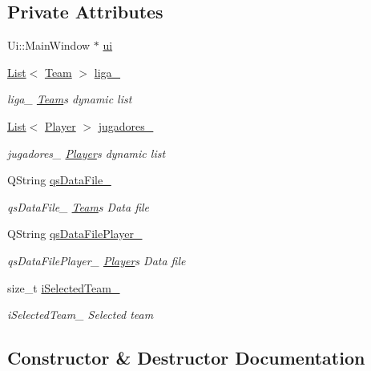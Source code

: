 \subsection*{Private Attributes}
\begin{DoxyCompactItemize}
\item 
Ui\+::\+Main\+Window $\ast$ \hyperlink{class_main_window_a35466a70ed47252a0191168126a352a5}{ui}
\item 
\hyperlink{class_list}{List}$<$ \hyperlink{class_team}{Team} $>$ \hyperlink{class_main_window_a5358b34e5fbb97d75dc06c61e7ae50fb}{liga\+\_\+}
\begin{DoxyCompactList}\small\item\em liga\+\_\+ \hyperlink{class_team}{Team}\textquotesingle{}s dynamic list \end{DoxyCompactList}\item 
\hyperlink{class_list}{List}$<$ \hyperlink{class_player}{Player} $>$ \hyperlink{class_main_window_aa0bb31955571995d85c4d9fda8bc9bbb}{jugadores\+\_\+}
\begin{DoxyCompactList}\small\item\em jugadores\+\_\+ \hyperlink{class_player}{Player}\textquotesingle{}s dynamic list \end{DoxyCompactList}\item 
Q\+String \hyperlink{class_main_window_accae73696fc981f52f13a1e51b411ccb}{qs\+Data\+File\+\_\+}
\begin{DoxyCompactList}\small\item\em qs\+Data\+File\+\_\+ \hyperlink{class_team}{Team}\textquotesingle{}s Data file \end{DoxyCompactList}\item 
Q\+String \hyperlink{class_main_window_aa4336777565d0c2a9ad6f0b96bc4c004}{qs\+Data\+File\+Player\+\_\+}
\begin{DoxyCompactList}\small\item\em qs\+Data\+File\+Player\+\_\+ \hyperlink{class_player}{Player}\textquotesingle{}s Data file \end{DoxyCompactList}\item 
size\+\_\+t \hyperlink{class_main_window_ab6d6da80222e139234012a2a39f72522}{i\+Selected\+Team\+\_\+}
\begin{DoxyCompactList}\small\item\em i\+Selected\+Team\+\_\+ Selected team \end{DoxyCompactList}\end{DoxyCompactItemize}


\subsection{Constructor \& Destructor Documentation}
\hypertarget{class_main_window_a8b244be8b7b7db1b08de2a2acb9409db}{}
